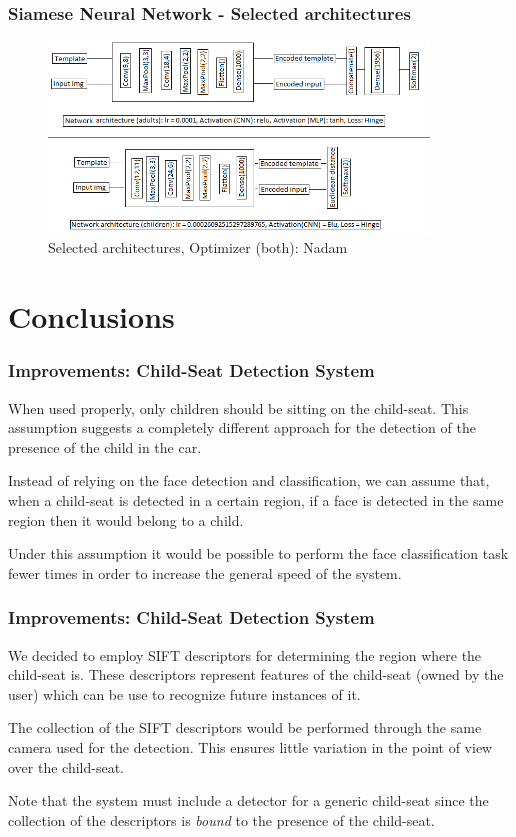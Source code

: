 \documentclass{beamer}
\begin{document}
	\begin{frame}
		\frametitle {Siamese Neural Network - Selected architectures}
		\begin{figure}
			\centering
			\includegraphics[width=0.9\textwidth, height=0.65\textheight]{img/schema_modelli_unico.png}
    		\caption{Selected architectures, Optimizer (both): Nadam}
    		\label{fig:selected_architectures}
		\end{figure}
	\end{frame}
	
	\section{Conclusions}
	
	\begin{frame}
		\frametitle{Improvements: Child-Seat Detection System}
		When used properly, only children should be sitting on the child-seat. This assumption suggests a completely different approach for the detection of the presence of the child in the car.
		
		\bigskip
		
		Instead of relying on the face detection and classification, we can assume that, when a child-seat is detected in a certain region, if a face is detected in the same region then it would belong to a child.
		
		\bigskip
		
		Under this assumption it would be possible to perform the face classification task fewer times in order to increase the general speed of the system.
	\end{frame}

	\begin{frame}
		\frametitle{Improvements: Child-Seat Detection System}
		We decided to employ SIFT descriptors for determining the region where the child-seat is. These descriptors represent features of the child-seat (owned by the user) which can be use to recognize future instances of it.
		
		\bigskip
		
		The collection of the SIFT descriptors would be performed through the same camera used for the detection. This ensures little variation in the point of view over the child-seat.
		
		\bigskip
		
		Note that the system must include a detector for a generic child-seat since the collection of the descriptors is \textit{bound} to the presence of the child-seat.
	\end{frame}
\end{document}
